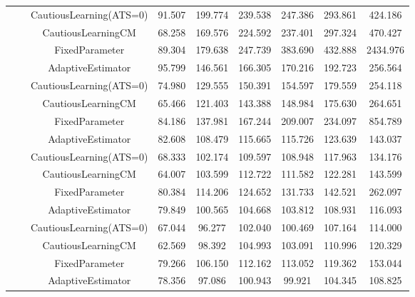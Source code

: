 \begin{table}[!h]
\begin{tabular}[t]{ccccccccc}
 &  & CautiousLearning(ATS=0) & 91.507 & 199.774 & 239.538 & 247.386 & 293.861 & 424.186\\

 &  & CautiousLearningCM & 68.258 & 169.576 & 224.592 & 237.401 & 297.324 & 470.427\\

 & \multirow[t]{-4}{*}{\centering\arraybackslash 0.35} & FixedParameter & 89.304 & 179.638 & 247.739 & 383.690 & 432.888 & 2434.976\\
\cmidrule{2-9}
 &  & AdaptiveEstimator & 95.799 & 146.561 & 166.305 & 170.216 & 192.723 & 256.564\\

 &  & CautiousLearning(ATS=0) & 74.980 & 129.555 & 150.391 & 154.597 & 179.559 & 254.118\\

 &  & CautiousLearningCM & 65.466 & 121.403 & 143.388 & 148.984 & 175.630 & 264.651\\

 & \multirow[t]{-4}{*}{\centering\arraybackslash 0.50} & FixedParameter & 84.186 & 137.981 & 167.244 & 209.007 & 234.097 & 854.789\\
\cmidrule{2-9}
 &  & AdaptiveEstimator & 82.608 & 108.479 & 115.665 & 115.726 & 123.639 & 143.037\\

 &  & CautiousLearning(ATS=0) & 68.333 & 102.174 & 109.597 & 108.948 & 117.963 & 134.176\\

 &  & CautiousLearningCM & 64.007 & 103.599 & 112.722 & 111.582 & 122.281 & 143.599\\

 & \multirow[t]{-4}{*}{\centering\arraybackslash 0.75} & FixedParameter & 80.384 & 114.206 & 124.652 & 131.733 & 142.521 & 262.097\\
\cmidrule{2-9}
 &  & AdaptiveEstimator & 79.849 & 100.565 & 104.668 & 103.812 & 108.931 & 116.093\\

 &  & CautiousLearning(ATS=0) & 67.044 & 96.277 & 102.040 & 100.469 & 107.164 & 114.000\\

 &  & CautiousLearningCM & 62.569 & 98.392 & 104.993 & 103.091 & 110.996 & 120.329\\

 & \multirow[t]{-4}{*}{\centering\arraybackslash 1.00} & FixedParameter & 79.266 & 106.150 & 112.162 & 113.052 & 119.362 & 153.044\\
\cmidrule{2-9}
 &  & AdaptiveEstimator & 78.356 & 97.086 & 100.943 & 99.921 & 104.345 & 108.825\\


\end{tabular}
\end{table}
